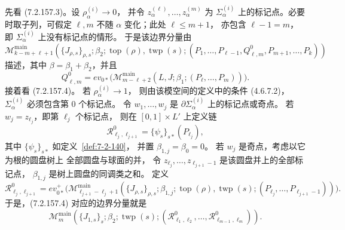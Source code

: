先看 (7.2.157.3)。设
$\rho_\alpha^{(i)}\to0$，
并令 $z_\alpha^{(\ell)},\ldots,
z_\alpha^{(m)}$ 为 $\Sigma_\alpha^{(i)}$
上的标记点。必要时取子列，可假定 $\ell,m$
不随 $\alpha$ 变化；此处 $\ell\le m+1$，
亦包含 $\ell-1=m$，即
$\Sigma_\alpha^{(i)}$ 上没有标记点的情形。
于是该边界分量由
\begin{equation}
\mathcal M_{k-m+\ell+1}^{\mathrm{main}}
(\{J_{\rho,s}\}_{\rho,s};\beta_2;
\operatorname{top}(\rho),\operatorname{twp}(s);
(P_1,\ldots,P_{\ell-1},Q^0_{\ell,m},
P_{m+1},\ldots,P_k))
\tag{7.2.158.1}\label{eq:7-2-158-1}
\end{equation}
描述，其中 $\beta=\beta_1+\beta_2$，并且
\begin{equation}
Q^0_{\ell,m}=ev_{0*}
\bigl(\mathcal M_{m-\ell+2}^{\mathrm{main}}
(L,J;\beta_1;(P_\ell,\ldots,P_m))\bigr).
\tag{7.2.158.2}\label{eq:7-2-158-2}
\end{equation}
接着看 (7.2.157.4)。
若 $\rho_\alpha^{(i)}\to1$，
则由该模空间的定义中的条件 (4.6.7.2)，
$\Sigma_\alpha^{(i)}$ 必须包含第 $0$ 个标记点。
令 $w_1,\ldots,w_j$ 是
$\partial\Sigma_\alpha^{(i)}$ 上的标记点或奇点。
若 $w_j=z_{\ell_j}$，即第 $\ell_j$ 个标记点，
则在 $[0,1]\times L'$ 上定义链
\begin{equation}
\mathcal R^0_{\ell_j,\ell_{j+1}}
=\{\psi_s\}_{s*}(P_{\ell_j}),
\tag{7.2.159.1}\label{eq:7-2-159-1}
\end{equation}
其中 $\{\psi_s\}_{s*}$ 如定义~\ref{def:7-2-140}，
并置 $\beta_{1,j}=\beta_0=0$。
若 $w_j$ 是奇点，考虑以它为根的圆盘树上
全部圆盘与球面的并，
令 $z_{\ell_j},\ldots,z_{\ell_{j+1}-1}$
是该圆盘并上的全部标记点，
$\beta_{1,j}$ 是树上圆盘的同调类之和。
定义
\begin{equation}
\mathcal R^0_{\ell_j,\ell_{j+1}}
=ev_{0*}^+\bigl(
\mathcal M_{\ell_{j+1}-\ell_j+1}^{\mathrm{main}}
(\{J_{\rho,s}\}_{\rho,s};\beta_{1,j};
\operatorname{top}(\rho),\operatorname{twp}(s);
(P_{\ell_j},\ldots,P_{\ell_{j+1}-1}))\bigr).
\tag{7.2.159.2}\label{eq:7-2-159-2}
\end{equation}
于是，(7.2.157.4) 对应的边界分量就是
\begin{equation}
\mathcal M_m^{\mathrm{main}}
(\{J_{1,s}\}_s;\beta_2;
\operatorname{twp}(s);
(\mathcal R^0_{\ell_1,\ell_2},\ldots,
\mathcal R^0_{\ell_{m-1},\ell_m})).
\tag{7.2.159.3}\label{eq:7-2-159-3}
\end{equation}

